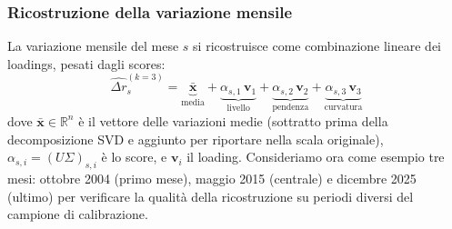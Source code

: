 \documentclass[11pt,a4paper]{article}
\theoremstyle{plain}
\theoremstyle{definition}
\theoremstyle{remark}
\begin{document}



\subsubsection{Ricostruzione della variazione mensile}
\label{sec:ricostruzione}

La variazione mensile del mese $s$ si ricostruisce come combinazione lineare
dei loadings, pesati dagli scores:
\begin{equation}
  \hat{\Delta r}^{(k=3)}_s
  = \underbrace{\bar{\mathbf{x}}}_{\text{media}}
  + \underbrace{\alpha_{s,1}\,\mathbf{v}_1}_{\text{livello}}
  + \underbrace{\alpha_{s,2}\,\mathbf{v}_2}_{\text{pendenza}}
  + \underbrace{\alpha_{s,3}\,\mathbf{v}_3}_{\text{curvatura}}
  \label{eq:ricostruzione}
\end{equation}
dove $\bar{\mathbf{x}} \in \mathbb{R}^n$ è il vettore delle variazioni medie
(sottratto prima della decomposizione SVD e aggiunto per riportare nella scala originale),
$\alpha_{s,i} = (U\Sigma)_{s,i}$ è lo score, e $\mathbf{v}_i$ il loading.
\newline
Consideriamo ora come esempio tre mesi: ottobre 2004 (primo mese), maggio 2015 (centrale) e
dicembre 2025 (ultimo) per verificare la qualità della ricostruzione
su periodi diversi del campione di calibrazione.
\end{document}
